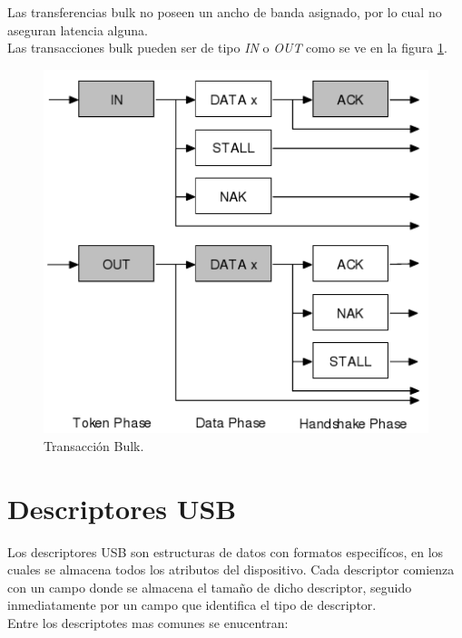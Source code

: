 Las transferencias bulk no poseen un ancho de banda asignado, por lo cual no
aseguran latencia alguna.\\

Las transacciones bulk pueden ser de tipo \emph{IN} o \emph{OUT} como se ve en
la figura \ref{fig:usb_bulk_transaction}.

\begin{figure}
\centering
\includegraphics[scale=0.5]{./img/usb_bulk_transaction.png}
\caption{Transacci\'on Bulk.}
\label{fig:usb_bulk_transaction}
\end{figure}


\clearpage
\section{Descriptores USB}
Los descriptores USB son estructuras de datos con formatos especif\'icos, en
los cuales se almacena todos los atributos del dispositivo.
Cada descriptor comienza con un campo donde se almacena el tama\~no de dicho
descriptor, seguido inmediatamente por un campo que identifica el tipo de
descriptor.\\
Entre los descriptotes mas comunes se enucentran:

